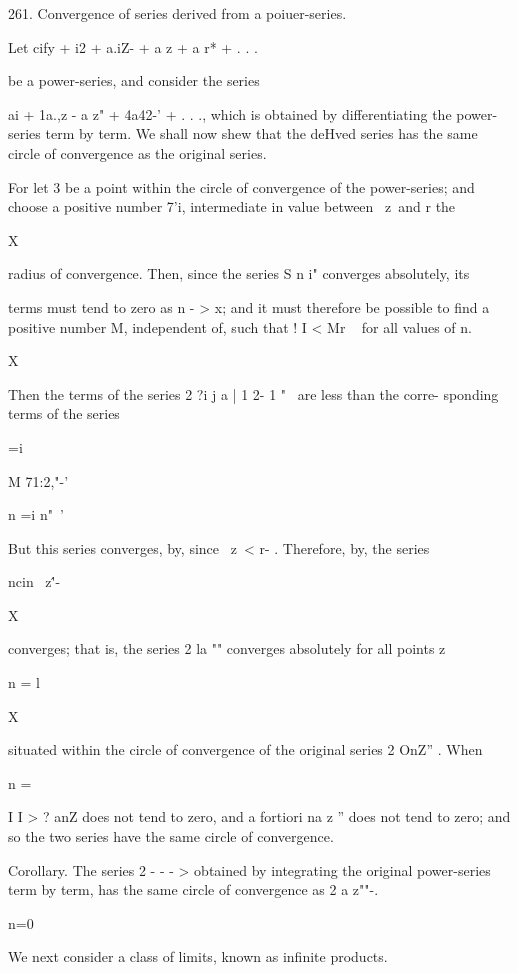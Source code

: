 261. Convergence of series derived from a poiuer-series.

Let cify + i2 + a.iZ- + a z + a r* + . . .

be a power-series, and consider the series

ai + 1a.,z - a z" + 4a42-' + . . ., which is obtained by
differentiating the power-series term by term. We shall now shew that
the deHved series has the same circle of convergence as the original
series.

For let 3 be a point within the circle of convergence of the
power-series; and choose a positive number 7'i, intermediate in value
between \ z\ and r the

X

radius of convergence. Then, since the series S n i" converges
absolutely, its

terms must tend to zero as n - > x; and it must therefore be possible
to find a positive number M, independent of, such that ! I < Mr ~ for
all values of n.

 X

Then the terms of the series 2 ?i j a | 1 2- 1 "~ are less than the
corre- sponding terms of the series

 =i

M 71:2,"-'

n =i n"~'

But this series converges, by, since \ z\ < r- . Therefore, by, the series

 ncin \ z\''-

X

converges; that is, the series 2 la "" converges absolutely for all
points z

n = l

X

situated within the circle of convergence of the original series 2
OnZ'' . When

n =

I I > ? anZ does not tend to zero, and a fortiori na z '' does not
tend to zero; and so the two series have the same circle of
convergence.

%
%

Corollary. The series 2 - - - > obtained by integrating the original
power-series term by term, has the same circle of convergence as 2 a
z""-.

n=0


We next consider a class of limits, known as infinite products.

